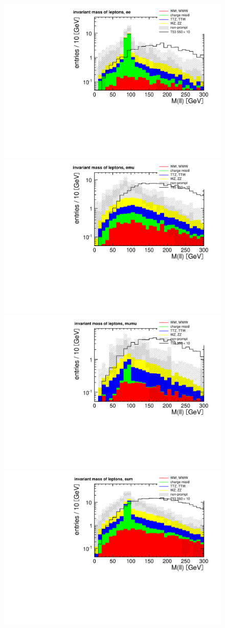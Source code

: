 \begin{figure}[htb]
    \centering
    \includegraphics[width=.7\textwidth]{images/pdf/same-sign,_2_jets/lep_mass_ee_0}
    \includegraphics[width=.7\textwidth]{images/pdf/same-sign,_2_jets/lep_mass_emu_0}
    \includegraphics[width=.7\textwidth]{images/pdf/same-sign,_2_jets/lep_mass_mumu_0}
    \includegraphics[width=.7\textwidth]{images/pdf/same-sign,_2_jets/lep_mass_sum_0}

\end{figure}
